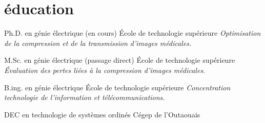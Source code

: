 \documentclass[]{friggeri-cv}
\newif\ifenglish
\begin{document}

\ifenglish\section{education}\else\section{éducation}\fi

\begin{entrylist}
  \ifenglish
    \entry {since 2011} {Ph.D. in electrical engineering} {École de technologie supérieure} {\emph{TODO}}
  \else
     {Ph.D. en génie électrique (en cours)} {École de technologie supérieure} {\emph{Optimisation de la compression et de la transmission d'images médicales.}}
  \fi

  \ifenglish
    \entry {2009-2010} {M.Sc. in electrical engineering (incomplete)} {École de technologie supérieure} {\emph{TODO}}
  \else
     {M.Sc. en génie électrique (passage direct)} {École de technologie supérieure} {\emph{Évaluation des pertes liées à la compression d'images médicales.}}
  \fi

  \ifenglish
    \entry {2005-2009} {B.ing. in electrical engineering} {École de technologie supérieure} {\emph{TODO}}
  \else
     {B.ing. en génie électrique} {École de technologie supérieure} {\emph{Concentration technologie de l'information et télécommunications.}}
  \fi

  \ifenglish
    \entry {2001-2005} {B.ing. in electrical engineering} {École de technologie supérieure} {\emph{TODO}}
  \else
     {DEC en technologie de systèmes ordinés} {Cégep de l’Outaouais} {}
  \fi
\end{entrylist}


\end{document}
